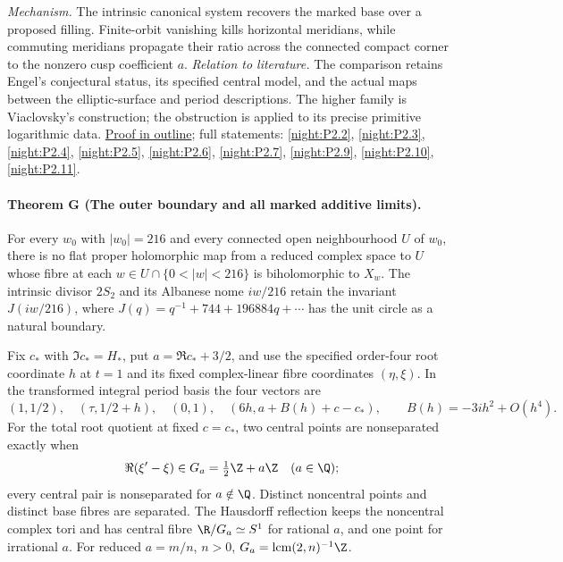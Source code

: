 \textit{Mechanism.} The intrinsic canonical system recovers the
marked base over a proposed filling.  Finite-orbit vanishing kills
horizontal meridians, while commuting meridians propagate their
ratio across the connected compact corner to the nonzero cusp
coefficient $a$.
\textit{Relation to literature.} The comparison retains Engel's
conjectural status, its specified central model, and the actual
maps between the elliptic-surface and period descriptions.  The
higher family is Viaclovsky's construction; the obstruction is
applied to its precise primitive logarithmic data.
\hyperlink{outline-I-F}{Proof in outline}; full statements:
\ref{night:P2.2}, \ref{night:P2.3}, \ref{night:P2.4},
\ref{night:P2.5}, \ref{night:P2.6}, \ref{night:P2.7},
\ref{night:P2.9}, \ref{night:P2.10}, \ref{night:P2.11}.

\hypertarget{main-I-G}{}
\paragraph{Theorem G (The outer boundary and all marked additive limits).}
\label{series:I:G}
For every $w_0$ with $|w_0|=216$ and every connected open
neighbourhood $U$ of $w_0$, there is no flat proper holomorphic
map from a reduced complex space to $U$ whose fibre at each
$w\in U\cap\{0<|w|<216\}$ is biholomorphic to $X_w$.
The intrinsic divisor $2S_2$ and its Albanese nome $iw/216$
retain the invariant $J(iw/216)$, where
$J(q)=q^{-1}+744+196884q+\cdots$ has the unit circle as a
natural boundary.

Fix $c_*$ with $\Im c_*=H_*$, put $a=\Re c_*+3/2$, and use the
specified order-four root coordinate $h$ at $t=1$ and its fixed
complex-linear fibre coordinates $(\eta,\xi)$.  In the transformed
integral period basis the four vectors are
\[
 (1,1/2),\quad(\tau,1/2+h),\quad(0,1),
 \quad(6h,a+B(h)+c-c_*),
 \qquad B(h)=-3ih^2+O(h^4).
\]
For the total root quotient at fixed $c=c_*$, two central points
are nonseparated exactly when
\[
 \Re(\xi'-\xi)\in G_a=\tfrac12\Z+a\Z\quad(a\in\Q);
\]
every central pair is nonseparated for $a\notin\Q$.  Distinct
noncentral points and distinct base fibres are separated.
The Hausdorff reflection keeps the noncentral complex tori and
has central fibre $\R/G_a\simeq S^1$ for rational $a$, and one
point for irrational $a$.  For reduced $a=m/n$, $n>0$,
$G_a=\operatorname{lcm}(2,n)^{-1}\Z$.

